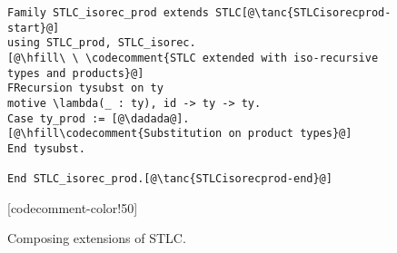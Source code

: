 \begin{figure}
\begin{minipage}{\textwidth}
\begin{multicols}{2}

\begin{lstlisting}
Family STLC_isorec_prod extends STLC[@\tanc{STLCisorecprod-start}@]
using STLC_prod, STLC_isorec.
[@\hfill\ \ \codecomment{STLC extended with iso-recursive types and products}@]
FRecursion tysubst on ty
motive \lambda(_ : ty), id -> ty -> ty.
Case ty_prod := [@\dadada@].[@\hfill\codecomment{Substitution on product types}@]
End tysubst.

End STLC_isorec_prod.[@\tanc{STLCisorecprod-end}@]
\end{lstlisting}

[codecomment-color!50]

\end{multicols}
\end{minipage}

\caption{Composing extensions of STLC.}
\label{fig:stlc-isorec-prod}
\end{figure}